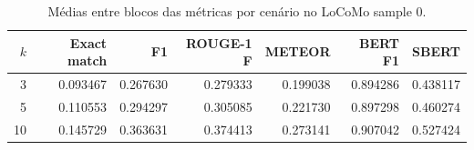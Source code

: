\begin{table}[t]
\centering
\caption{Médias entre blocos das métricas por cenário no LoCoMo sample 0.}
\label{tab:metricas-secundarias}
\begin{tabular}{rrrrrrr}
\toprule
$k$ & Exact match & F1 & ROUGE-1 F & METEOR & BERT F1 & SBERT \\
\midrule
3 & 0.093467 & 0.267630 & 0.279333 & 0.199038 & 0.894286 & 0.438117 \\
5 & 0.110553 & 0.294297 & 0.305085 & 0.221730 & 0.897298 & 0.460274 \\
10 & 0.145729 & 0.363631 & 0.374413 & 0.273141 & 0.907042 & 0.527424 \\
\bottomrule
\end{tabular}
\end{table}
